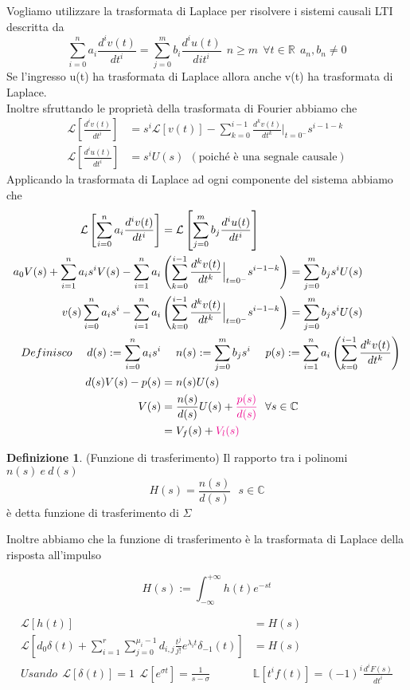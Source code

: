 \documentclass{article}
\theoremstyle{definition}
\newtheorem*{definizione}{Definizione}
\newcommand{\R}{\mathbb{R}}
\newcommand{\la}{\lambda}
\newcommand{\intinf}{\int_{-\infty}^{+\infty}}
\newcommand{\sistema}{\sum_{i=0}^{n}a_i \frac{d^i v(t)}{dt^i}=\sum_{j=0}^{m}b_i \frac{d^i u(t)}{dit^i}}
\begin{document}
	Vogliamo utilizzare la trasformata di Laplace per risolvere i sistemi causali LTI descritta da 
	$$\sistema \ \ n \geq m \ \ \forall t \in \R \ \ a_n , b_n \neq 0$$
	Se l'ingresso u(t) ha trasformata di Laplace allora anche v(t) ha trasformata di Laplace.\\ Inoltre sfruttando le proprietà della trasformata di Fourier abbiamo che 
	\begin{align*}
	\mathcal{L}\left[\frac{d^iv(t)}{dt^i}\right]&=s^i \mathcal{L}[v(t)] - \sum_{k=0}^{i-1}\frac{d^kv(t)}{dt^k} \Big|_{t=0^-} s^{i-1-k} \\ 
	\mathcal{L}\left[\frac{d^iu(t)}{dt^i}\right]&=s^i U(s) \ \ (\text{poiché è una segnale causale})
		\end{align*}
		Applicando la trasformata di Laplace ad ogni componente del sistema abbiamo che 
		\begin{align*}
			\mathcal{L}\left[\sum_{i=0}^{n}a_i \frac{d^i v(t)}{dt^i} \right]&=\mathcal{L}\left[\sum_{j=0}^{m}b_j \frac{d^iu(t)}{dt^i} \right] \\
			a_0 V(s) + \sum_{i=1}^{n}a_i s^i V(s) - \sum_{i=1}^{n}a_i&\left(\sum_{k=0}^{i-1}\frac{d^kv(t)}{dt^k} \Big|_{t=0^-} s^{i-1-k}\right)= \sum_{j=0}^{m}b_j s^i U(s) \\
			v(s)\sum_{i=0}^{n}a_i s^i  - \sum_{i=1}^{n}a_i&\left(\sum_{k=0}^{i-1}\frac{d^kv(t)}{dt^k} \Big|_{t=0^-} s^{i-1-k}\right)= \sum_{j=0}^{m}b_j s^i U(s) \\ 
			 Definisco \ \ \ \ d(s) := \sum_{i=0}^{n}a_i s^i  & \ \ \ \ n(s):= \sum_{j=0}^{m}b_j s^i \ \ \ \ p(s):= \sum_{i=1}^{n}a_i\left(\sum_{k=0}^{i-1}\frac{d^kv(t)}{dt^k}\right) \\
		  d(s) V(s)-p(s)&=n(s)U(s) \\
		 V(s)&=\frac{n(s)}{d(s)}U(s) + \textcolor{magenta}{\frac{p(s)}{d(s)} }\ \ \forall s \in \mathbb{C}  \\
		 &= V_f(s)+ \textcolor{magenta}{V_l(s)}
		\end{align*}
		\begin{definizione}(Funzione di trasferimento)
			Il rapporto tra i polinomi $n(s) \ e \ d(s)$ 
			$$H(s) = \frac{n(s)}{d(s)} \ \ \ s \in \mathbb{C} $$ \label{formu:1}
			è detta funzione di trasferimento di $\Sigma$
		\end{definizione}
		Inoltre abbiamo che la funzione di trasferimento è la trasformata di Laplace della risposta all'impulso 
		\begin{tcolorbox}
$$H(s):=\intinf h(t)e^{-st}$$ 
		\end{tcolorbox}
		\begin{align*}
		\mathcal{L}[h(t)]&=H(s) \\ 
		\mathcal{L}\left[d_0 \delta(t)+\sum_{i=1}^{r}\sum_{j=0}^{\mu_i-1}d_{i,j}\frac{t^j}{j!}e^{\la_i t}\delta_{-1}(t)\right]&=H(s) \\  
		Usando  \ \ \mathcal{L}[\delta(t)]=1 \ \ \mathcal{L}[e^{\sigma t}]=\frac{1}{s-\sigma }\ \ & \mathbb{L}[t^if(t)]=(-1)^i \frac{d^iF(s)}{dt^i}\\ 
		\end{align*}
\end{document}
